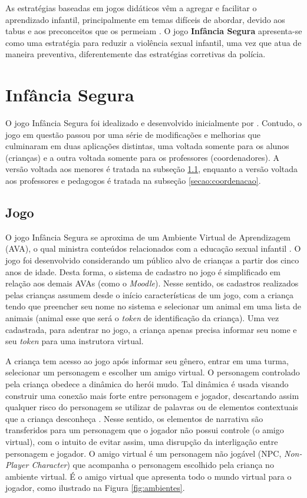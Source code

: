 \documentclass[12pt]{article}
\begin{document}
As estratégias baseadas em jogos didáticos vêm a agregar e facilitar o aprendizado infantil, principalmente em temas difíceis de abordar, devido aos tabus e aos preconceitos  que os permeiam \cite{miranda2018abordagem}. O jogo \textbf{Infância Segura} apresenta-se como uma estratégia para reduzir a violência sexual infantil, uma vez que atua de maneira preventiva, diferentemente das estratégias corretivas da polícia. 


\section{Infância Segura}\label{secao:infancia}

O jogo Infância Segura foi idealizado e desenvolvido inicialmente por . Contudo, o jogo em questão passou por uma série de modificações e melhorias que culminaram em duas aplicações distintas, uma voltada somente para os alunos (crianças) e a outra voltada somente para os professores (coordenadores). A versão voltada aos menores é tratada na subseção \ref{secao:jogo}, enquanto a versão voltada aos professores e pedagogos é tratada na subseção \ref{secao:coordenacao}.


\subsection{Jogo}\label{secao:jogo}

O jogo Infância Segura se aproxima de um Ambiente Virtual de Aprendizagem (AVA), o qual ministra conteúdos relacionados com a educação sexual infantil \cite{tarouco2009gestao}. O jogo foi desenvolvido considerando um público alvo de crianças a partir dos cinco anos de idade. Desta forma, o sistema de cadastro no jogo é simplificado em relação aos demais AVAs (como o \textit{Moodle}). Nesse sentido, os cadastros realizados pelas crianças assumem desde o início características de um jogo, com a criança tendo que preencher seu nome no sistema e selecionar um animal em uma lista de animais (animal esse que será o \textit{token} de identificação da criança). Uma vez cadastrada, para adentrar no jogo, a criança apenas precisa informar seu nome e seu \textit{token} para uma instrutora virtual.

A criança tem acesso ao jogo após informar seu gênero, entrar em uma turma, selecionar um personagem e escolher um amigo virtual. O personagem controlado pela criança obedece a dinâmica do herói mudo. Tal dinâmica é usada visando construir uma conexão mais forte entre personagem e jogador, descartando assim qualquer risco do personagem se utilizar de palavras ou de elementos contextuais que a criança desconheça \cite{domsch2017dialogue}. Nesse sentido, os elementos de narrativa são transferidos para um personagem que o jogador não possui controle (o amigo virtual), com o intuito de evitar assim, uma disrupção da interligação entre personagem e jogador. O amigo virtual é um personagem não jogável (NPC, \textit{Non-Player Character}) que acompanha o personagem escolhido pela criança no ambiente virtual. É o amigo virtual que apresenta todo o mundo virtual para o jogador, como ilustrado na Figura \ref{fig:ambientes}.
\end{document}
